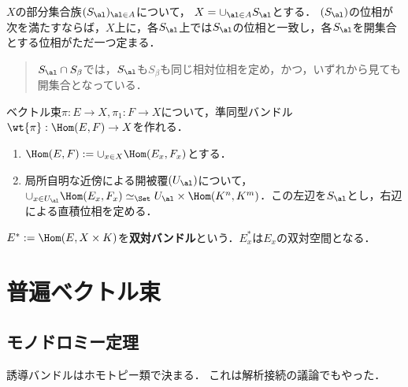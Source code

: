 \documentclass[uplatex,dvipdfmx]{jsreport}
\begin{document}
\begin{lemma}
    $X$の部分集合族$(S_\al)_{\al\in A}$について，
    $X=\cup_{\al\in A}S_\al$とする．
    $(S_\al)$の位相が次を満たすならば，$X$上に，各$S_\al$上では$S_\al$の位相と一致し，各$S_\al$を開集合とする位相がただ一つ定まる．
    \begin{quote}
        $S_\al\cap S_\beta$では，$S_\al$も$S_\beta$も同じ相対位相を定め，かつ，いずれから見ても開集合となっている．
    \end{quote}
\end{lemma}

\begin{example}[準同型バンドル]
    ベクトル束$\pi:E\to X,\pi_1:F\to X$について，準同型バンドル$\wt{\pi}:\Hom(E,F)\to X$を作れる．
    \begin{enumerate}
        \item $\Hom(E,F):=\cup_{x\in X}\Hom(E_x,F_x)$とする．
        \item 局所自明な近傍による開被覆$(U_\al)$について，$\cup_{x\in U_\al}\Hom(E_x,F_x)\simeq_\Set U_\al\times\Hom(K^n,K^m)$．この左辺を$S_\al$とし，右辺による直積位相を定める．
    \end{enumerate}
    $E^*:=\Hom(E,X\times K)$を\textbf{双対バンドル}という．$E_x^*$は$E_x$の双対空間となる．
\end{example}

\begin{example}[テンソルバンドル]
    
\end{example}

\begin{example}[外積バンドル]
    
\end{example}

\section{普遍ベクトル束}

\subsection{モノドロミー定理}

\begin{tcolorbox}[colframe=ForestGreen, colback=ForestGreen!10!white,breakable,colbacktitle=ForestGreen!40!white,coltitle=black,fonttitle=\bfseries\sffamily,
    title=]
        誘導バンドルはホモトピー類で決まる．
        これは解析接続の議論でもやった．
\end{tcolorbox}
\end{document}
